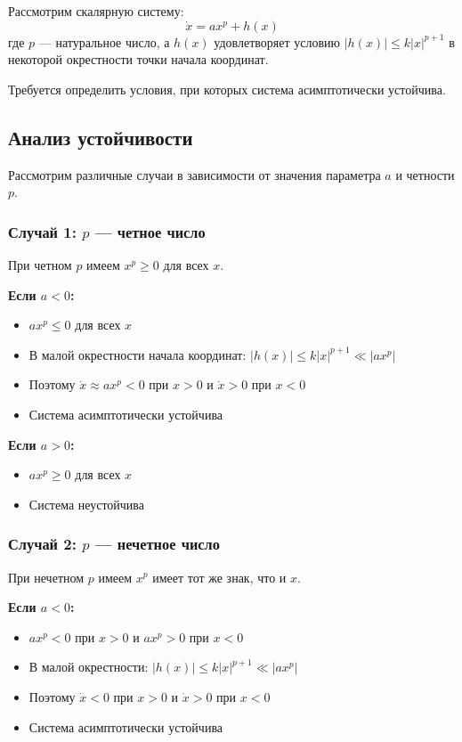 Рассмотрим скалярную систему:
\begin{equation}
\dot{x} = ax^p + h(x)
\end{equation}
где $p$ — натуральное число, а $h(x)$ удовлетворяет условию $|h(x)| \leq k|x|^{p+1}$ в некоторой окрестности точки начала координат.

Требуется определить условия, при которых система асимптотически устойчива.

\subsection*{Анализ устойчивости}

Рассмотрим различные случаи в зависимости от значения параметра $a$ и четности $p$.

\subsubsection*{Случай 1: $p$ — четное число}

При четном $p$ имеем $x^p \geq 0$ для всех $x$.

\textbf{Если $a < 0$:}
\begin{itemize}
\item $ax^p \leq 0$ для всех $x$
\item В малой окрестности начала координат: $|h(x)| \leq k|x|^{p+1} \ll |ax^p|$
\item Поэтому $\dot{x} \approx ax^p < 0$ при $x > 0$ и $\dot{x} > 0$ при $x < 0$
\item Система асимптотически устойчива
\end{itemize}

\textbf{Если $a > 0$:}
\begin{itemize}
\item $ax^p \geq 0$ для всех $x$
\item Система неустойчива
\end{itemize}

\subsubsection*{Случай 2: $p$ — нечетное число}

При нечетном $p$ имеем $x^p$ имеет тот же знак, что и $x$.

\textbf{Если $a < 0$:}
\begin{itemize}
\item $ax^p < 0$ при $x > 0$ и $ax^p > 0$ при $x < 0$
\item В малой окрестности: $|h(x)| \leq k|x|^{p+1} \ll |ax^p|$
\item Поэтому $\dot{x} < 0$ при $x > 0$ и $\dot{x} > 0$ при $x < 0$
\item Система асимптотически устойчива
\end{itemize}

